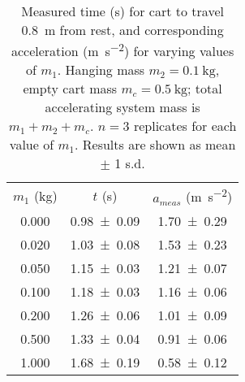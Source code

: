 \begin{table}
\begin{center}
\begin{ruledtabular}
\begin{tabular}{ccc}
$m_1$ (\unit{\kilo\gram}) & $t$ (\unit{\second}) & $a_{meas}$ (\unit{\meter\per\second\squared}) \\ 
\colrule
\num{0.000} & \num{0.98\pm0.09} & \num{1.70\pm0.29} \\ 
\num{0.020} & \num{1.03\pm0.08} & \num{1.53\pm0.23} \\ 
\num{0.050} & \num{1.15\pm0.03} & \num{1.21\pm0.07} \\ 
\num{0.100} & \num{1.18\pm0.03} & \num{1.16\pm0.06} \\ 
\num{0.200} & \num{1.26\pm0.06} & \num{1.01\pm0.09} \\ 
\num{0.500} & \num{1.33\pm0.04} & \num{0.91\pm0.06} \\ 
\num{1.000} & \num{1.68\pm0.19} & \num{0.58\pm0.12} \\ 
\end{tabular}
\end{ruledtabular}
\end{center}
\caption{\label{tab:newtable1} Measured time (\unit{\second}) for cart to travel \qty{0.8}{\meter} from rest, and corresponding acceleration (\unit{\meter\per\second\squared}) for varying values of $m_1$. Hanging mass $m_2=\qty{0.1}{\kilo\gram}$, empty cart mass $m_c=\qty{0.5}{\kilo\gram}$; total accelerating system mass is $m_1+m_2+m_c$. $n=3$ replicates for each value of $m_1$. Results are shown as mean $\pm$ 1 s.d.}
\end{table}
